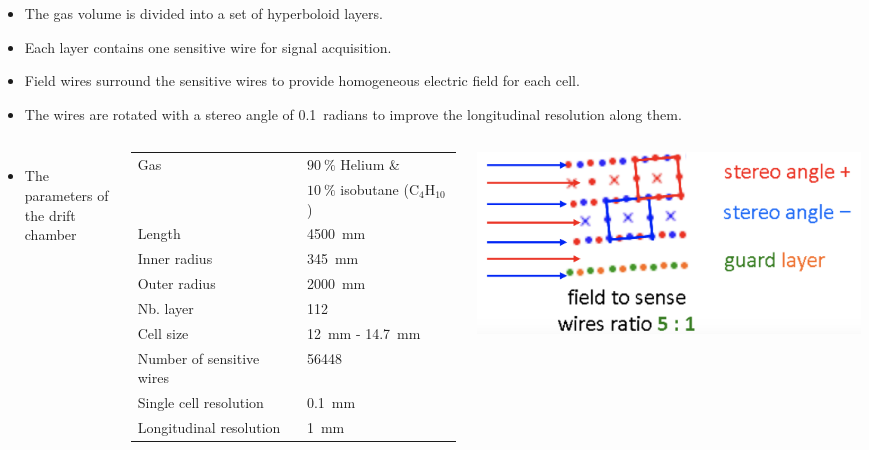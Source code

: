 \documentclass[final,xcolor={dvipsnames,svgnames,x11names,table}]{beamer}
\begin{document}
\begin{frame}
\begin{textblock}{43}
\begin{tcolorbox}[title=The drift chamber]
    \begin{itemize}
      \item The gas volume is divided into a set of hyperboloid layers.
      \item Each layer contains one sensitive wire for signal acquisition.
      \item Field wires surround the sensitive wires to provide homogeneous electric field for each cell.
      \item The wires are rotated with a stereo angle of 0.1~radians to improve the longitudinal resolution along them.
    \end{itemize}

    \begin{columns}
      \begin{itemize}
        \item The parameters of the drift chamber
      \end{itemize}

      \centering
      \begin{adjustbox}{max width=0.8\textwidth}
        \begin{tabular}{l l}
          \toprule
            Gas & $90~\%$ Helium \&\\
            & $10~\%$ isobutane ($\text{C}_{4}\text{H}_{10}$) \\
            Length & 4500~mm \\
            Inner radius & 345~mm \\
            Outer radius & 2000~mm\\
            Nb. layer & 112 \\
            Cell size & 12~mm - 14.7~mm \\
            Number of sensitive wires & 56448 \\
            Single cell resolution & 0.1~mm \\
            Longitudinal resolution & 1~mm \\
          \bottomrule
        \end{tabular}
      \end{adjustbox}

      \centering
      \includegraphics[width=\textwidth]{Figures/Field_sensWires.png}


\end{columns}
\end{tcolorbox}
\end{textblock}
\end{frame}
\end{document}
